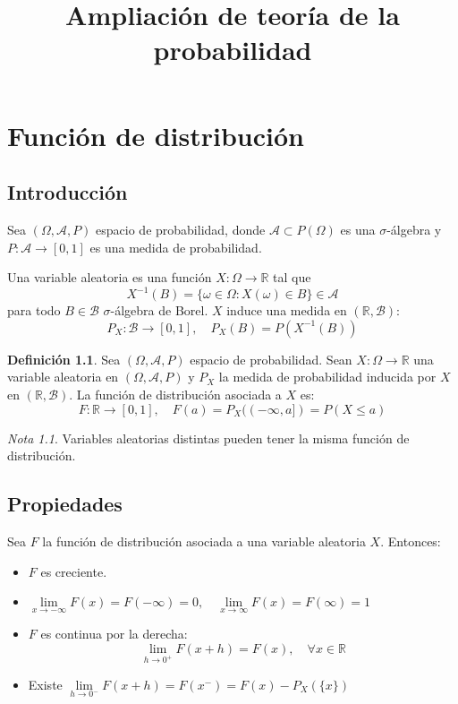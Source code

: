 \documentclass{report}
\title{Ampliación de teoría de la probabilidad}
\author{}
\theoremstyle{remark}
\theoremstyle{remark}
\newtheorem*{note}{Nota}
\theoremstyle{remark}
\theoremstyle{definition}
\newtheorem{definition}{Definición}[chapter]
\theoremstyle{definition}
\theoremstyle{definition}
\theoremstyle{definition}
\begin{document}
\maketitle
\tableofcontents

\chapter{Función de distribución}
\section{Introducción}
Sea $(\Omega, \mathcal{A}, P)$ espacio de probabilidad, donde $\mathcal{A} \subset P(\Omega)$ es una $\sigma$-álgebra y $P: \mathcal{A} \to [0, 1]$ es una medida de probabilidad.

Una variable aleatoria es una función $X: \Omega \to \mathbb{R}$ tal que
$$X^{-1}(B) = \{ \omega \in \Omega : X(\omega) \in B \} \in \mathcal{A}$$
para todo $B \in \mathcal{B}$ $\sigma$-álgebra de Borel.
$X$ induce una medida en $(\mathbb{R}, \mathcal{B})$:
$$P_X: \mathcal{B} \to [0, 1], \quad P_X(B) = P(X^{-1}(B))$$

\begin{definition}
    Sea $(\Omega, \mathcal{A}, P)$ espacio de probabilidad.
    Sean $X: \Omega \to \mathbb{R}$ una variable aleatoria en $(\Omega, \mathcal{A}, P)$ y $P_X$ la medida de probabilidad inducida por $X$ en $(\mathbb{R}, \mathcal{B})$.
    La función de distribución asociada a $X$ es:
    $$F: \mathbb{R} \to [0, 1], \quad F(a) = P_X((-\infty, a]) = P(X \leq a)$$
\end{definition}

\begin{note}
    Variables aleatorias distintas pueden tener la misma función de distribución.
\end{note}

\section{Propiedades}
Sea $F$ la función de distribución asociada a una variable aleatoria $X$.
Entonces:
\begin{itemize}
    \item $F$ es creciente.
    \item $\lim\limits_{x \to -\infty} F(x) = F(-\infty) = 0, \quad \lim\limits_{x \to \infty} F(x) = F(\infty) = 1$
    \item $F$ es continua por la derecha: $$\lim\limits_{h \to 0^+} F(x+h) = F(x), \quad \forall x \in \mathbb{R}$$
    \item Existe $\lim\limits_{h \to 0^-} F(x+h) = F(x^-) = F(x) - P_X(\{x\})$
\end{itemize}
\end{document}

